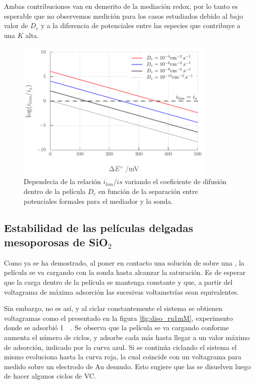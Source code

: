 		Ambas contribuciones van en demerito de la mediación redox, por lo tanto es esperable que no observemos medición para los casos estudiados debido al bajo valor de $D_e$ y a la diferencia de potenciales entre las especies que contribuye a una $K$ alta. 	


				\begin{figure}[h!]
				\centering
		 	    \includegraphics[width=0.87\textwidth]{Graficos/ilimite.pdf}
		        \caption[Dependencia de la mediación redox con $D_e$ y $K$]{Dependecia de la relación $i_{lim}/i{s}$ variando el coeficiente de difusión dentro de la película $D_e$ en función de la separación entre potenciales formales para el mediador y la sonda.}
		        \label{fig:ilimitee}
		      	\end{figure} 

	\subsection{Estabilidad de las películas delgadas mesoporosas de \texorpdfstring{SiO$_2$}{SiO2}}

		Como ya se ha demostrado, al poner en contacto una solución de \ru\space sobre una \pdmF, la película se va cargando con la sonda hasta alcanzar la saturación. Es de esperar que la carga dentro de la película se mantenga constante y que, a partir del voltagrama de máxima adsorción las sucesivas voltametrías sean equivalentes.

		Sin embargo, no es así, y al ciclar constantemente el sistema se obtienen voltagramas como el presentado en la figura \ref{fig:diso_ru1mM}, experimento donde se adsorbió \ru\space \SI{1}{\milli\Molar}. Se observa que la película se va cargando conforme aumenta el número de ciclos, y adsorbe cada más \ru\space hasta llegar a un valor máximo de adsorción, indicado por la curva azul. Si se continúa ciclando el sistema el mismo evoluciona hasta la curva roja, la cual coincide con un voltagrama para \ru\space medido sobre un electrodo de Au  desnudo. Esto sugiere que las \pdmF\space se disuelven luego de hacer algunos ciclos de VC.

